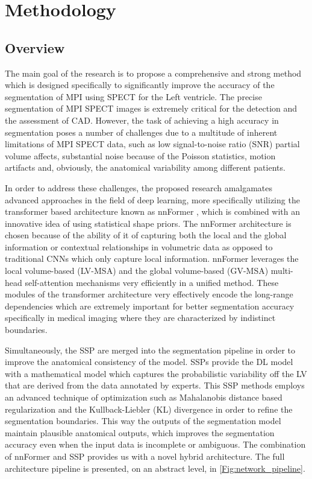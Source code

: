 \chapter{Methodology}
\label{ch:method}

\section{Overview}
The main goal of the research is to propose a comprehensive and strong method which is designed specifically to significantly improve the accuracy of the segmentation of MPI using SPECT for the Left ventricle. The precise segmentation of MPI SPECT images is extremely critical for the detection and the assessment of CAD. However, the task of achieving a high accuracy in segmentation poses a number of challenges due to a multitude of inherent limitations of MPI SPECT data, such as low signal-to-noise ratio (SNR) partial volume affects, substantial noise because of the Poisson statistics, motion artifacts and, obviously, the anatomical variability among different patients. 

In order to address these challenges, the proposed research amalgamates advanced approaches in the field of deep learning, more specifically utilizing the transformer based architecture known as nnFormer \cite{10.1109/TIP.2023.3293771}, which is combined with an innovative idea of using statistical shape priors. The nnFormer architecture is chosen because of the ability of it of capturing both the local and the global information or contextual relationships in volumetric data as opposed to traditional CNNs which only capture local information. nnFormer leverages the local volume-based (LV-MSA) and the global volume-based (GV-MSA) multi-head self-attention mechanisms very efficiently in a unified method. These modules of the transformer architecture very effectively encode the long-range dependencies which are extremely important for better segmentation accuracy specifically in medical imaging where they are characterized by indistinct boundaries.

Simultaneously, the SSP are merged into the segmentation pipeline in order to improve the anatomical consistency of the model. SSPs provide the DL model with a mathematical model which captures the probabilistic variability off the LV that are derived from the data annotated by experts. This SSP methods employs an advanced technique of optimization such as Mahalanobis distance based regularization and the Kullback-Liebler (KL) divergence in order to refine the segmentation boundaries. This way the outputs of the segmentation model maintain plausible anatomical outputs, which improves the segmentation accuracy even when the input data is incomplete or ambiguous. The combination of nnFormer and SSP provides us with a novel hybrid architecture. The full architecture pipeline is presented, on an abstract level, in \cref{Fig:network_pipeline}.

